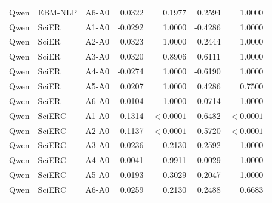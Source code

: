 \documentclass[fleqn,10pt]{wlscirep-authoryear}
\begin{document}
\begin{longtable}{llcrrrr}
Qwen & EBM-NLP & A6-A0 & 0.0322 & 0.1977 & 0.2594 & 1.0000 \\
\addlinespace[2pt]
Qwen & SciER & A1-A0 & -0.0292 & 1.0000 & -0.4286 & 1.0000 \\
Qwen & SciER & A2-A0 & 0.0323 & 1.0000 & 0.2444 & 1.0000 \\
Qwen & SciER & A3-A0 & 0.0320 & 0.8906 & 0.6111 & 1.0000 \\
Qwen & SciER & A4-A0 & -0.0274 & 1.0000 & -0.6190 & 1.0000 \\
Qwen & SciER & A5-A0 & 0.0207 & 1.0000 & 0.4286 & 0.7500 \\
Qwen & SciER & A6-A0 & -0.0104 & 1.0000 & -0.0714 & 1.0000 \\
\addlinespace[2pt]
Qwen & SciERC & A1-A0 & 0.1314 & $<0.0001$ & 0.6482 & $<0.0001$ \\
Qwen & SciERC & A2-A0 & 0.1137 & $<0.0001$ & 0.5720 & $<0.0001$ \\
Qwen & SciERC & A3-A0 & 0.0236 & 0.2130 & 0.2592 & 1.0000 \\
Qwen & SciERC & A4-A0 & -0.0041 & 0.9911 & -0.0029 & 1.0000 \\
Qwen & SciERC & A5-A0 & 0.0193 & 0.3029 & 0.2047 & 1.0000 \\
Qwen & SciERC & A6-A0 & 0.0259 & 0.2130 & 0.2488 & 0.6683 \\
\end{longtable}
\endgroup
\end{document}
